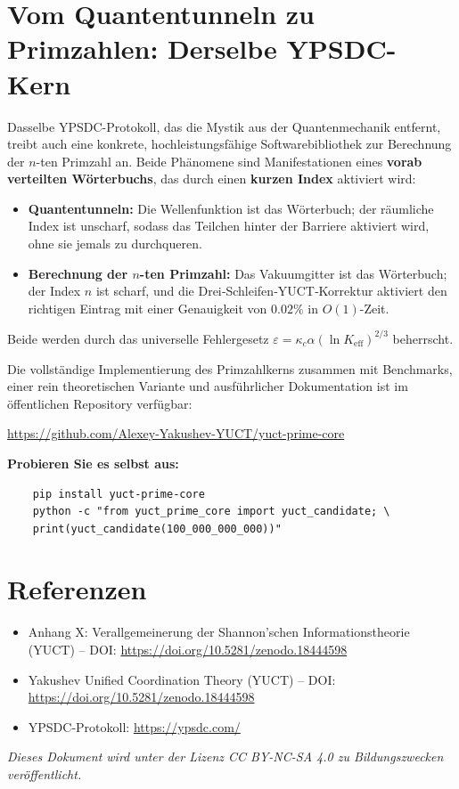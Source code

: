 \documentclass[12pt,a4paper]{article}
\begin{document}
\section{Vom Quantentunneln zu Primzahlen: Derselbe YPSDC-Kern}

Dasselbe YPSDC-Protokoll, das die Mystik aus der Quantenmechanik
entfernt, treibt auch eine konkrete, hochleistungsfähige
Softwarebibliothek zur Berechnung der $n$-ten Primzahl an. Beide
Phänomene sind Manifestationen eines \textbf{vorab verteilten
	Wörterbuchs}, das durch einen \textbf{kurzen Index} aktiviert wird:

\begin{itemize}
	\item \textbf{Quantentunneln:} Die Wellenfunktion ist das
	Wörterbuch; der räumliche Index ist unscharf, sodass das Teilchen
	hinter der Barriere aktiviert wird, ohne sie jemals zu durchqueren.
	\item \textbf{Berechnung der $n$-ten Primzahl:} Das Vakuumgitter ist das
	Wörterbuch; der Index $n$ ist scharf, und die Drei‑Schleifen‑YUCT‑Korrektur
	aktiviert den richtigen Eintrag mit einer Genauigkeit von $0.02\%$ in $O(1)$-Zeit.
\end{itemize}

Beide werden durch das universelle Fehlergesetz
$\varepsilon = \kappa_c\alpha(\ln K_{\mathrm{eff}})^{2/3}$ beherrscht.

Die vollständige Implementierung des Primzahlkerns zusammen mit
Benchmarks, einer rein theoretischen Variante und ausführlicher
Dokumentation ist im öffentlichen Repository verfügbar:

\begin{center}
	\url{https://github.com/Alexey-Yakushev-YUCT/yuct-prime-core}
\end{center}

\textbf{Probieren Sie es selbst aus:}
\begin{verbatim}
	pip install yuct-prime-core
	python -c "from yuct_prime_core import yuct_candidate; \
	print(yuct_candidate(100_000_000_000))"
\end{verbatim}

	\section{Referenzen}
	\begin{itemize}
		\item Anhang X: Verallgemeinerung der Shannon'schen Informationstheorie (YUCT) -- DOI: \url{https://doi.org/10.5281/zenodo.18444598}
		\item Yakushev Unified Coordination Theory (YUCT) -- DOI: \url{https://doi.org/10.5281/zenodo.18444598}
		\item YPSDC-Protokoll: \url{https://ypsdc.com/}
	\end{itemize}
	
	\noindent\textit{Dieses Dokument wird unter der Lizenz CC BY-NC-SA 4.0 zu Bildungszwecken veröffentlicht.}
	
\end{document}
